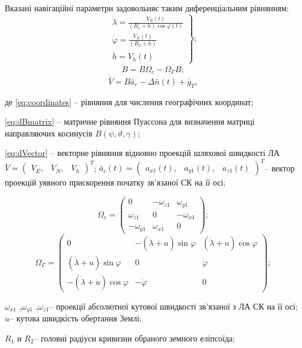Вказані навігаційні параметри задовольняє таким диференціальним рівнянням:
\begin{equation}
\left .
\begin{array}{l} 
{\dot{\lambda }=
\frac{V_{E} \left(t\right)}{\left(R_{1}+h\right)\cos \varphi \left(t\right)} } \\ 
{\dot{\varphi }=\frac{V_{N} \left(t\right)}{\left(R_{2} +h\right)} } \\
{\dot{h}=V_{h} \left(t\right)} \end{array}\right\};
\label{eq:coordinates}
\end{equation}
\begin{equation}
\dot{B}=B\Omega_{c} -\Omega_{\Gamma}B ;               
\label{eq:dBmatrix}
\end{equation}
\begin{equation}
\dot{\bar{V}}=B\bar{a}_{c} -\Delta \bar{n}\left(t\right)+\bar{g}_{T} ,     
\label{eq:dVector}
\end{equation}
\begin{ESKDexplanation}
\item де \eqref{eq:coordinates} -- рівняння для числення географічних координат; 
\item \eqref{eq:dBmatrix} -- матричне рівняння Пуассона для визначення матриці 
направляючих косинусів $B\left(\psi ,\vartheta ,\gamma \right)$; 
\item \eqref{eq:dVector} -- векторне рівняння відновно 
проекцій шляхової швидкості ЛА 
$\bar{V}=\left(\begin{array}{ccc} {V_{E} ,} & {V_{N} 
,} & {V_{h} } \end{array}\right)^{T} $; $\bar{a}_{c} \left(t\right)=\left(\begin{array}{ccc} 
{a_{x1} \left(t\right),} & {a_{y1} \left(t\right),} & {a_{z1} \left(t\right)} \end{array}
\right)^{T} $-- вектор проекцій уявного прискорення початку зв'язаної СК на її осі;
\end{ESKDexplanation}
\[\Omega_{c} =\left(\begin{array}{ccc} 
{0} & {-\omega {}_{z1} } & {\omega {}_{y1} } \\ 
{\omega {}_{z1} } & {0} & {-\omega {}_{x1} } \\ 
{-\omega {}_{y1} } & {\omega {}_{x1}} & {0} 
\end{array}\right);\] 
\[\Omega_{\Gamma } =\left(\begin{array}{ccc} 
{0} & {-(\dot{\lambda }+u)\sin \varphi } & {(\dot{\lambda }+u)\cos \varphi } \\ 
{(\dot{\lambda}+u)\sin \varphi } & {0} & {\dot{\varphi }} \\
{-(\dot{\lambda }+u)\cos \varphi } & {-\dot{\varphi }} & {0} 
\end{array}\right);\] 
\begin{ESKDexplanation}
\item $\omega_{x1}$ ,$\omega_{y1}$ ,$\omega_{z1}$-- проекції абсолютної кутової швидкості 
зв'язаної з ЛА СК на її осі; $u$-- кутова швидкість обертання Землі; 
\item $R_{1} $ и $R_{2} $-- головні радіуси кривизни обраного земного еліпсоїда;
\end{ESKDexplanation}

